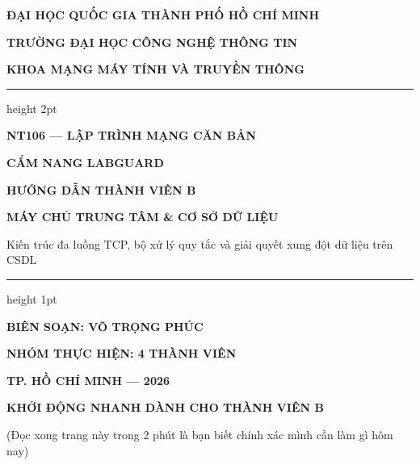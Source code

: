 \documentclass[12pt,a4paper]{article}
\begin{document}
\begin{titlepage}
  \centering
  \vspace*{-10mm}
  {\bfseries\large ĐẠI HỌC QUỐC GIA THÀNH PHỐ HỒ CHÍ MINH\par}
  {\bfseries\large TRƯỜNG ĐẠI HỌC CÔNG NGHỆ THÔNG TIN\par}
  {\bfseries\large KHOA MẠNG MÁY TÍNH VÀ TRUYỀN THÔNG\par}
  \vspace{15mm}
  {\color{lgDeepBlue}\hrule height 2pt}
  \vspace{12mm}
  {\bfseries\large NT106 — LẬP TRÌNH MẠNG CĂN BẢN\par}
  \vspace{12mm}
  {\bfseries\huge\color{lgDeepBlue} CẨM NANG LABGUARD\par}
  \vspace{5mm}
  {\bfseries\Huge\color{lgDeepBlue} HƯỚNG DẪN THÀNH VIÊN B\par}
  \vspace{8mm}
  {\bfseries\Large MÁY CHỦ TRUNG TÂM \& CƠ SỞ DỮ LIỆU\par}
  \vspace{4mm}
  {\large Kiến trúc đa luồng TCP, bộ xử lý quy tắc và giải quyết xung đột dữ liệu trên CSDL\par}
  \vspace{12mm}
  {\color{lgTeal}\hrule height 1pt}
  \vspace{25mm}
  {\large\textbf{BIÊN SOẠN: VÕ TRỌNG PHÚC}\par}
  \vspace{6mm}
  {\large\textbf{NHÓM THỰC HIỆN: 4 THÀNH VIÊN}\par}
  \vfill
  {\bfseries\color{lgSlate} TP. HỒ CHÍ MINH — 2026\par}
\end{titlepage}

\thispagestyle{empty}
\vspace*{-12mm}
{\centering\Large\bfseries\color{lgDeepBlue} KHỞI ĐỘNG NHANH DÀNH CHO THÀNH VIÊN B\par}
\vspace{1mm}
{\centering\footnotesize\color{lgGray} (Đọc xong trang này trong 2 phút là bạn biết chính xác mình cần làm gì hôm nay)\par}
\vspace{3mm}
\end{document}

